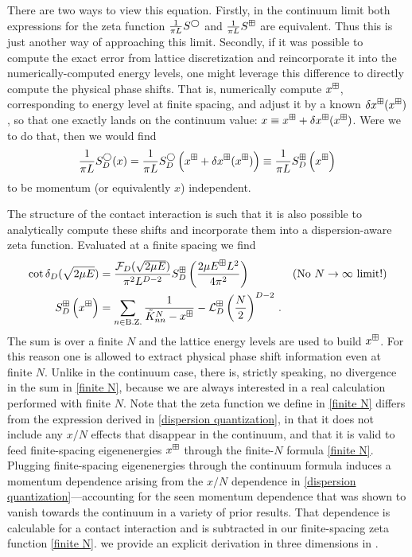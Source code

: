There are two ways to view this equation.
Firstly, in the continuum limit both expressions for the zeta function $\frac{1}{\pi L}S^\bigcirc$ and $\frac{1}{\pi L}S^\boxplus$ are equivalent.
Thus this is just another way of approaching this limit.
Secondly, if it was possible to compute the exact error from lattice discretization and reincorporate it into the numerically-computed energy levels, one might leverage this difference to directly compute the physical phase shifts.
That is, numerically compute $x^\boxplus$, corresponding to energy level at finite spacing, and adjust it by a known $\delta x^\boxplus(x^\boxplus)$, so that one exactly lands on the continuum value: $x \equiv x^\boxplus + \delta x^\boxplus(x^\boxplus)$.
Were we to do that, then we would find
\begin{equation}
    \frac{1}{\pi L}S^\bigcirc_D(x)
    =
    \frac{1}{\pi L}S^\bigcirc_D\left(x^\boxplus+\delta x^\boxplus(x^\boxplus)\right)
    \equiv
    \frac{1}{\pi L}S^\boxplus_D\left(x^\boxplus\right)
\end{equation}
to be momentum (or equivalently $x$) independent.

The structure of the contact interaction is such that it is also possible to analytically compute these shifts and incorporate them into a dispersion-aware zeta function.
Evaluated at a finite spacing we find
\begin{align}
    \cot \delta_D(\sqrt{2\mu E})
    &=
    \frac{\mathcal{F}_D(\sqrt{2\mu E})}{\pi^2 L^{D-2}} S^{\boxplus }_D\left(\frac{2\mu E^{\boxplus} L^2}{4\pi^2}\right)
    && \text{(No $N\rightarrow\infty$ limit!)}
    \\
    \label{eq:finite N}
    S^{\boxplus}_D\left(x^\boxplus\right)
    &=
		\sum_{n\in\text{B.Z.}}\frac{1}{ \tilde K_{nn}^{N} - x^\boxplus} - \mathcal{L}_D^{\boxplus}\left(\frac{N}{2}\right)^{D-2}
	\, .
\end{align}
The sum is over a finite $N$ and the lattice energy levels are used to build $x^\boxplus$.
For this reason one is allowed to extract physical phase shift information even at finite $N$.
Unlike in the continuum case, there is, strictly speaking, no divergence in the sum in \eqref{finite N}, because we are always interested in a real calculation performed with finite $N$.
Note that the zeta function we define in \eqref{finite N} differs from the expression derived in \eqref{dispersion quantization}, in that it does not include any $x/N$ effects that disappear in the continuum, and that it is valid to feed finite-spacing eigenenergies $x^\boxplus$ through the finite-$N$ formula \eqref{finite N}.
Plugging finite-spacing eigenenergies through the continuum formula induces a momentum dependence arising from the $x/N$ dependence in \eqref{dispersion quantization}---accounting for the seen momentum dependence that was shown to vanish towards the continuum in a variety of prior results.
That dependence is calculable for a contact interaction and is subtracted in our finite-spacing zeta function \eqref{finite N}.
we provide an explicit derivation in three dimensions in .

